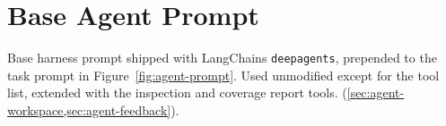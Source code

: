 %

\chapter{Base Agent Prompt}
\label{appendix:deepagents_prompt}

Base harness prompt shipped with LangChains \texttt{deepagents}, prepended to the task prompt in Figure~\ref{fig:agent-prompt}.
Used unmodified except for the tool list, extended with the inspection and coverage report tools.
(\cref{sec:agent-workspace,sec:agent-feedback}).


